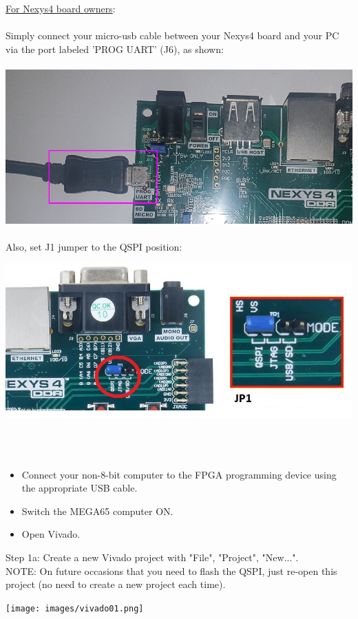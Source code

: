 \begin{tcolorbox}[colback=white,coltext=black]
\underline{For Nexys4 board owners}: \\
\\
  Simply connect your micro-usb cable between your Nexys4 board and your PC via the port labeled 'PROG UART' (J6), as shown: \\
\\
\includegraphics[width=\linewidth]{images/nexys4_comms.png}
\\
\\
Also, set J1 jumper to the QSPI position:
\\
\begin{center}
  \includegraphics[width=0.8\linewidth]{images/nexys4_j2.png}
\end{center}

\end{tcolorbox}
\\
\\
\begin{itemize}
  \item Connect your non-8-bit computer to the FPGA programming device using the appropriate USB cable.
  \item Switch the MEGA65 computer ON.
  \item Open Vivado.
\end{itemize}


\begin{minipage}{\linewidth}
  Step 1a: Create a new Vivado project with "File", "Project", "New...". \\
  NOTE: On future occasions that you need to flash the QSPI, just re-open this project (no need to create a new project each time).  \\
  \begin{center}
    \texttt{[image: images/vivado01.png]}
  \end{center}
\end{minipage}

